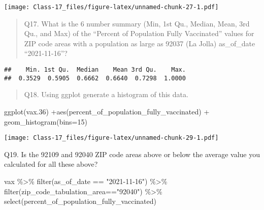 \documentclass[
]{article}
\newenvironment{Shaded}{\begin{snugshade}}{\end{snugshade}}
\newcommand{\AttributeTok}[1]{\textcolor[rgb]{0.77,0.63,0.00}{#1}}
\newcommand{\DecValTok}[1]{\textcolor[rgb]{0.00,0.00,0.81}{#1}}
\newcommand{\FloatTok}[1]{\textcolor[rgb]{0.00,0.00,0.81}{#1}}
\newcommand{\FunctionTok}[1]{\textcolor[rgb]{0.00,0.00,0.00}{#1}}
\newcommand{\NormalTok}[1]{#1}
\newcommand{\SpecialCharTok}[1]{\textcolor[rgb]{0.00,0.00,0.00}{#1}}
\newcommand{\StringTok}[1]{\textcolor[rgb]{0.31,0.60,0.02}{#1}}
\begin{document}
\texttt{[image: Class-17\_files/figure-latex/unnamed-chunk-27-1.pdf]}

\begin{quote}
Q17. What is the 6 number summary (Min, 1st Qu., Median, Mean, 3rd Qu.,
and Max) of the ``Percent of Population Fully Vaccinated'' values for
ZIP code areas with a population as large as 92037 (La Jolla)
as\_of\_date ``2021-11-16''?
\end{quote}

\begin{Shaded}
\end{Shaded}

\begin{verbatim}
##    Min. 1st Qu.  Median    Mean 3rd Qu.    Max. 
##  0.3529  0.5905  0.6662  0.6640  0.7298  1.0000
\end{verbatim}

\begin{quote}
Q18. Using ggplot generate a histogram of this data.
\end{quote}

\begin{Shaded}
\begin{Highlighting}[]
\FunctionTok{ggplot}\NormalTok{(vax}\FloatTok{.36}\NormalTok{) }\SpecialCharTok{+}\FunctionTok{aes}\NormalTok{(percent\_of\_population\_fully\_vaccinated) }\SpecialCharTok{+} \FunctionTok{geom\_histogram}\NormalTok{(}\AttributeTok{bins=}\DecValTok{15}\NormalTok{)}
\end{Highlighting}
\end{Shaded}

\texttt{[image: Class-17\_files/figure-latex/unnamed-chunk-29-1.pdf]}

Q19. Is the 92109 and 92040 ZIP code areas above or below the average
value you calculated for all these above?

\begin{Shaded}
\begin{Highlighting}[]
\NormalTok{vax }\SpecialCharTok{\%\textgreater{}\%} \FunctionTok{filter}\NormalTok{(as\_of\_date }\SpecialCharTok{==} \StringTok{"2021{-}11{-}16"}\NormalTok{) }\SpecialCharTok{\%\textgreater{}\%}  
  \FunctionTok{filter}\NormalTok{(zip\_code\_tabulation\_area}\SpecialCharTok{==}\StringTok{"92040"}\NormalTok{) }\SpecialCharTok{\%\textgreater{}\%}
  \FunctionTok{select}\NormalTok{(percent\_of\_population\_fully\_vaccinated)}
\end{Highlighting}
\end{Shaded}
\end{document}
